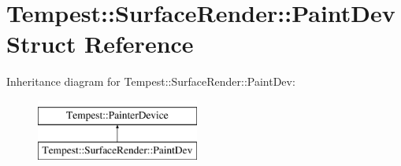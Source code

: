 \hypertarget{struct_tempest_1_1_surface_render_1_1_paint_dev}{\section{Tempest\+:\+:Surface\+Render\+:\+:Paint\+Dev Struct Reference}
\label{struct_tempest_1_1_surface_render_1_1_paint_dev}
}
Inheritance diagram for Tempest\+:\+:Surface\+Render\+:\+:Paint\+Dev\+:\begin{figure}[H]
\begin{center}
\leavevmode
\includegraphics[height=2.000000cm]{struct_tempest_1_1_surface_render_1_1_paint_dev}
\end{center}
\end{figure}
